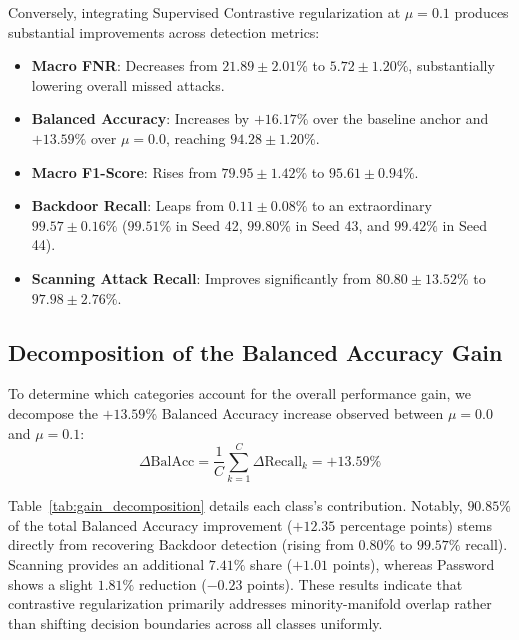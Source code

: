 \documentclass[12pt,a4paper]{report}
\begin{document}
Conversely, integrating Supervised Contrastive regularization at $\mu = 0.1$ produces substantial improvements across detection metrics:
\begin{itemize}
    \item \textbf{Macro FNR}: Decreases from $21.89 \pm 2.01\%$ to $\mathbf{5.72 \pm 1.20\%}$, substantially lowering overall missed attacks.
    \item \textbf{Balanced Accuracy}: Increases by $+16.17\%$ over the baseline anchor and $+13.59\%$ over $\mu = 0.0$, reaching $\mathbf{94.28 \pm 1.20\%}$.
    \item \textbf{Macro F1-Score}: Rises from $79.95 \pm 1.42\%$ to $\mathbf{95.61 \pm 0.94\%}$.
    \item \textbf{Backdoor Recall}: Leaps from $0.11 \pm 0.08\%$ to an extraordinary $\mathbf{99.57 \pm 0.16\%}$ ($99.51\%$ in Seed 42, $99.80\%$ in Seed 43, and $99.42\%$ in Seed 44).
    \item \textbf{Scanning Attack Recall}: Improves significantly from $80.80 \pm 13.52\%$ to $\mathbf{97.98 \pm 2.76\%}$.
\end{itemize}

\subsection{Decomposition of the Balanced Accuracy Gain}
\label{sec:gain_decomposition}

To determine which categories account for the overall performance gain, we decompose the $+13.59\%$ Balanced Accuracy increase observed between $\mu = 0.0$ and $\mu = 0.1$:
\begin{equation}
\Delta \text{BalAcc} = \frac{1}{C} \sum_{k=1}^C \Delta \text{Recall}_k = +13.59\%
\label{eq:decomposition_eq}
\end{equation}

Table~\ref{tab:gain_decomposition} details each class's contribution. Notably, $\mathbf{90.85\%}$ of the total Balanced Accuracy improvement ($+12.35$ percentage points) stems directly from recovering Backdoor detection (rising from $0.80\%$ to $99.57\%$ recall). Scanning provides an additional $7.41\%$ share ($+1.01$ points), whereas Password shows a slight $1.81\%$ reduction ($-0.23$ points). These results indicate that contrastive regularization primarily addresses minority-manifold overlap rather than shifting decision boundaries across all classes uniformly.
\end{document}
